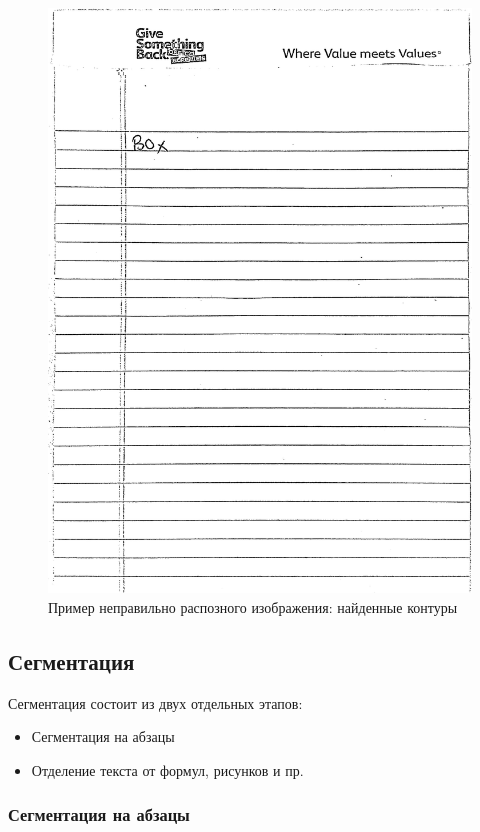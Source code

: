 \begin{figure}
    \includegraphics[scale=0.15]{img/perspective/wrong_output.JPG}
    \caption{Пример неправильно распозного изображения: найденные контуры}
    \label{perspective_wrong_output}
\end{figure}

\subsection{Сегментация}

Сегментация состоит из двух отдельных этапов:
\begin{itemize}
    \item Сегментация на абзацы
    \item Отделение текста от формул, рисунков и пр.
\end{itemize}

\subsubsection{Сегментация на абзацы}

